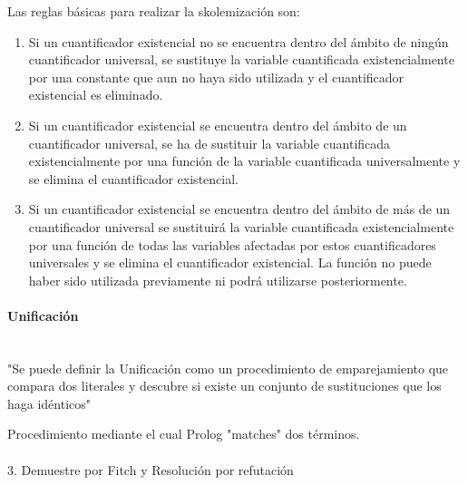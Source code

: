 \documentclass{article}
\begin{document}
 Las reglas básicas para realizar la skolemización son:
\begin{enumerate}

\item Si un cuantificador existencial no se encuentra dentro del \'ambito de ning\'un cuantificador universal, se sustituye la variable cuantificada existencialmente por una constante que aun no haya sido utilizada y el cuantificador existencial es eliminado.

\item Si un cuantificador existencial se encuentra dentro del \'ambito de un cuantificador universal, se ha de sustituir la variable cuantificada existencialmente por una funci\'on de la variable cuantificada universalmente y se elimina el cuantificador existencial.
	
\item Si un cuantificador existencial se encuentra dentro del \'ambito de más de un cuantificador universal se sustituir\'a la variable cuantificada existencialmente por una funci\'on de todas las variables afectadas por estos cuantificadores universales y se elimina el cuantificador existencial. La funci\'on no puede haber sido utilizada previamente ni podr\'a utilizarse posteriormente.

\end{enumerate}

\paragraph{Unificaci\'on}\mbox{}\\

"Se puede definir la Unificación como un procedimiento de emparejamiento que compara dos literales y descubre si existe un conjunto de sustituciones que los haga id\'enticos"

Procedimiento mediante el cual Prolog "matches" dos t\'erminos.


\paragraph{}

3. Demuestre por Fitch y Resoluci\'on por refutaci\'on
\end{document}
